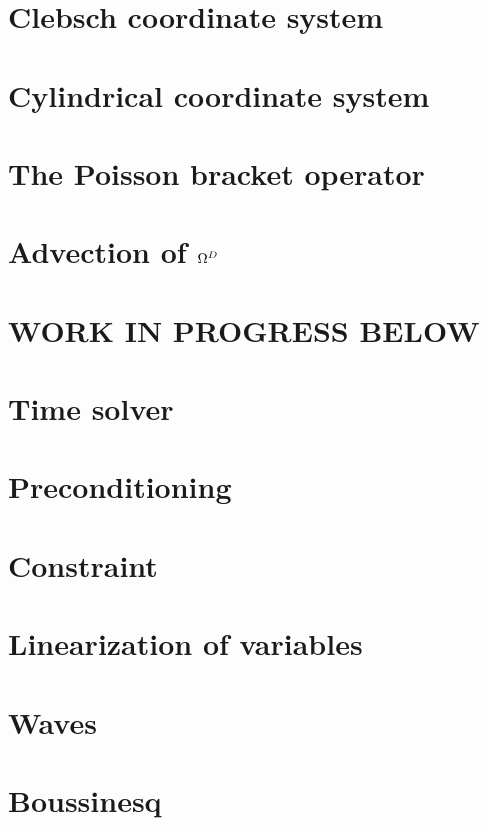 \documentclass[12pt,a4paper,oneside,openright]{report} %
\begin{document}
\chapter{Clebsch coordinate system}
\label{app:Clebsch}


\chapter{Cylindrical coordinate system}
\label{app:cylcoord}


\chapter{The Poisson bracket operator}
\label{app:poisson}


\chapter{Advection of \texorpdfstring{$\Omega^D$}{OmegaD}}
\label{app:vortDAdv}


\chapter{WORK IN PROGRESS BELOW}

\chapter{Time solver}
\label{app:timeSolver}


\chapter{Preconditioning}
\label{app:precon}


\chapter{Constraint}


\chapter{Linearization of variables}
\label{app:linearized}


\chapter{Waves}
\label{app:waves}


\chapter{Boussinesq}
\label{app:boussinesq}




\end{document}
